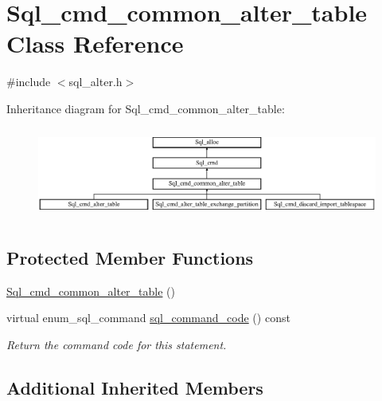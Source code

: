 \hypertarget{classSql__cmd__common__alter__table}{}\section{Sql\+\_\+cmd\+\_\+common\+\_\+alter\+\_\+table Class Reference}
\label{classSql__cmd__common__alter__table}


{\ttfamily \#include $<$sql\+\_\+alter.\+h$>$}

Inheritance diagram for Sql\+\_\+cmd\+\_\+common\+\_\+alter\+\_\+table\+:\begin{figure}[H]
\begin{center}
\leavevmode
\includegraphics[height=3.022942cm]{classSql__cmd__common__alter__table}
\end{center}
\end{figure}
\subsection*{Protected Member Functions}
\begin{DoxyCompactItemize}
\item 
\mbox{\hyperlink{classSql__cmd__common__alter__table_a0bb60d8f132da6bb4c6a534c8f971736}{Sql\+\_\+cmd\+\_\+common\+\_\+alter\+\_\+table}} ()
\item 
\mbox{\label{classSql__cmd__common__alter__table_a82cc76861efe969e9733dd5280b8bd4a}} 
virtual enum\+\_\+sql\+\_\+command \mbox{\hyperlink{classSql__cmd__common__alter__table_a82cc76861efe969e9733dd5280b8bd4a}{sql\+\_\+command\+\_\+code}} () const
\begin{DoxyCompactList}\small\item\em Return the command code for this statement. \end{DoxyCompactList}\end{DoxyCompactItemize}
\subsection*{Additional Inherited Members}


